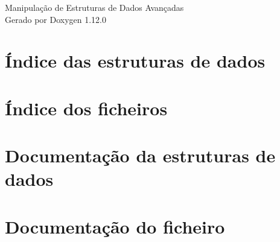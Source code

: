 \documentclass[twoside]{book}
\newcommand{\+}{\discretionary{\mbox{\scriptsize$\hookleftarrow$}}{}{}}
\newcommand{\clearemptydoublepage}{%
    \newpage{\pagestyle{empty}\cleardoublepage}%
  }
\begin{document}
  \raggedbottom
    \hypersetup{pageanchor=false,
                bookmarksnumbered=true,
                pdfencoding=unicode
               }
  \begin{titlepage}
  \vspace*{7cm}
  \begin{center}%
  {\Large Manipulação de Estruturas de Dados Avançadas}\\
  \vspace*{1cm}
  {\large Gerado por Doxygen 1.12.0}\\
  \end{center}
  \end{titlepage}
  \clearemptydoublepage
  \tableofcontents
  \clearemptydoublepage
  \hypersetup{pageanchor=true}
\chapter{Índice das estruturas de dados}

\chapter{Índice dos ficheiros}

\chapter{Documentação da estruturas de dados}


\chapter{Documentação do ficheiro}






  \backmatter
  \newpage
  \clearemptydoublepage
  \printindex
\end{document}
